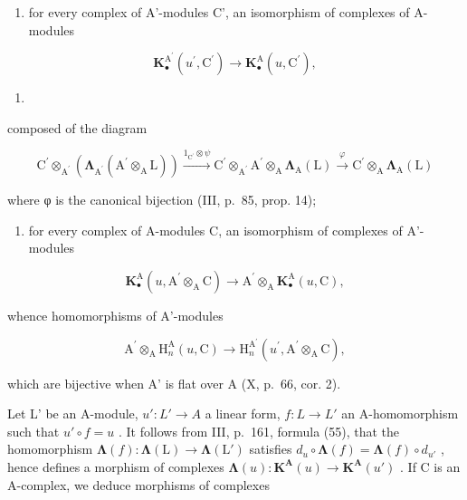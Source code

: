 \begin{enumerate}
\def\labelenumi{\arabic{enumi})}
\tightlist
\item
  for every complex of A'-modules C', an isomorphism of complexes of A-modules
\end{enumerate}

\[
\mathbf {K} _ {\bullet} ^ {\mathrm{A} ^ {\prime}} \left(u ^ {\prime}, \mathrm{C} ^ {\prime}\right)\rightarrow \mathbf {K} _ {\bullet} ^ {\mathrm{A}} \left(u, \mathrm{C} ^ {\prime}\right),
\]

\begin{enumerate}
\def\labelenumi{(\arabic{enumi})}
\setcounter{enumi}{8}
\tightlist
\item
\end{enumerate}

composed of the diagram

\[
\mathrm{C} ^ {\prime} \otimes_ {\mathrm{A} ^ {\prime}} \left(\boldsymbol {\Lambda} _ {\mathrm{A} ^ {\prime}} \left(\mathrm{A} ^ {\prime} \otimes_ {\mathrm{A}} \mathrm{L}\right)\right) \xrightarrow {1 _ {\mathrm{C} ^ {\prime}} \otimes \psi} \mathrm{C} ^ {\prime} \otimes_ {\mathrm{A} ^ {\prime}} \mathrm{A} ^ {\prime} \otimes_ {\mathrm{A}} \boldsymbol {\Lambda} _ {\mathrm{A}} (\mathrm{L}) \xrightarrow {\varphi} \mathrm{C} ^ {\prime} \otimes_ {\mathrm{A}} \boldsymbol {\Lambda} _ {\mathrm{A}} (\mathrm{L})
\]

where φ is the canonical bijection (III, p.~85, prop. 14);

\begin{enumerate}
\def\labelenumi{\arabic{enumi})}
\setcounter{enumi}{1}
\tightlist
\item
  for every complex of A-modules C, an isomorphism of complexes of A'-modules
\end{enumerate}

\[
\mathbf {K} _ {\bullet} ^ {\mathrm{A}} (u, \mathrm{A} ^ {\prime} \otimes_ {\mathrm{A}} \mathrm{C}) \rightarrow \mathrm{A} ^ {\prime} \otimes_ {\mathrm{A}} \mathbf {K} _ {\bullet} ^ {\mathrm{A}} (u, \mathrm{C}),
\]

whence homomorphisms of A'-modules

\[
\mathrm{A} ^ {\prime} \otimes_ {\mathrm{A}} \mathrm{H} _ {n} ^ {\mathrm{A}} (u, \mathrm{C}) \rightarrow \mathrm{H} _ {n} ^ {\mathrm{A} ^ {\prime}} (u ^ {\prime}, \mathrm{A} ^ {\prime} \otimes_ {\mathrm{A}} \mathrm{C}),
\]

which are bijective when A' is flat over A (X, p.~66, cor. 2).

Let L' be an A-module, \(u': L' \to A\) a linear form, \(f: L \to L'\) an A-homomorphism such that \(u' \circ f = u\) . It follows from III, p.~161, formula (55), that the homomorphism \(\symbf{\Lambda}(f): \symbf{\Lambda}(\mathrm{L}) \to \symbf{\Lambda}(\mathrm{L}')\) satisfies \(d_u \circ \symbf{\Lambda}(f) = \symbf{\Lambda}(f) \circ d_{u'}\) , hence defines a morphism of complexes \(\symbf{\Lambda}(u): \mathbf{K}^{\mathbf{A}}(u) \to \mathbf{K}^{\mathbf{A}}(u')\) . If C is an A-complex, we deduce morphisms of complexes

